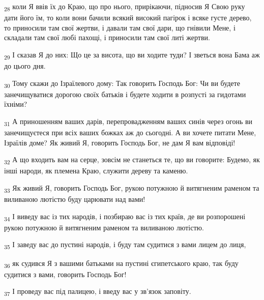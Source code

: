 \begin{tcolorbox}
\textsubscript{28} коли Я ввів їх до Краю, що про нього, прирікаючи, підносив Я Свою руку дати його їм, то коли вони бачили всякий високий пагірок і всяке густе дерево, то приносили там свої жертви, і давали там свої дари, що гнівили Мене, і складали там свої любі пахощі, і приносили там свої литі жертви.
\end{tcolorbox}
\begin{tcolorbox}
\textsubscript{29} І сказав Я до них: Що це за висота, що ви ходите туди? І зветься вона Бама аж до цього дня.
\end{tcolorbox}
\begin{tcolorbox}
\textsubscript{30} Тому скажи до Ізраїлевого дому: Так говорить Господь Бог: Чи ви будете занечищуватися дорогою своїх батьків і будете ходити в розпусті за гидотами їхніми?
\end{tcolorbox}
\begin{tcolorbox}
\textsubscript{31} А приношенням ваших дарів, перепровадженням ваших синів через огонь ви занечищуєтеся при всіх ваших божках аж до сьогодні. А ви хочете питати Мене, Ізраїлів доме? Як живий Я, говорить Господь Бог, не дам Я вам відповіді!
\end{tcolorbox}
\begin{tcolorbox}
\textsubscript{32} А що входить вам на серце, зовсім не станеться те, що ви говорите: Будемо, як інші народи, як племена Краю, служити дереву та каменю.
\end{tcolorbox}
\begin{tcolorbox}
\textsubscript{33} Як живий Я, говорить Господь Бог, рукою потужною й витягненим раменом та виливаною лютістю буду царювати над вами!
\end{tcolorbox}
\begin{tcolorbox}
\textsubscript{34} І виведу вас із тих народів, і позбираю вас із тих країв, де ви розпорошені рукою потужною й витягненим раменом та виливаною лютістю.
\end{tcolorbox}
\begin{tcolorbox}
\textsubscript{35} І заведу вас до пустині народів, і буду там судитися з вами лицем до лиця,
\end{tcolorbox}
\begin{tcolorbox}
\textsubscript{36} як судився Я з вашими батьками на пустині єгипетського краю, так буду судитися з вами, говорить Господь Бог!
\end{tcolorbox}
\begin{tcolorbox}
\textsubscript{37} І проведу вас під палицею, і введу вас у зв'язок заповіту.
\end{tcolorbox}
